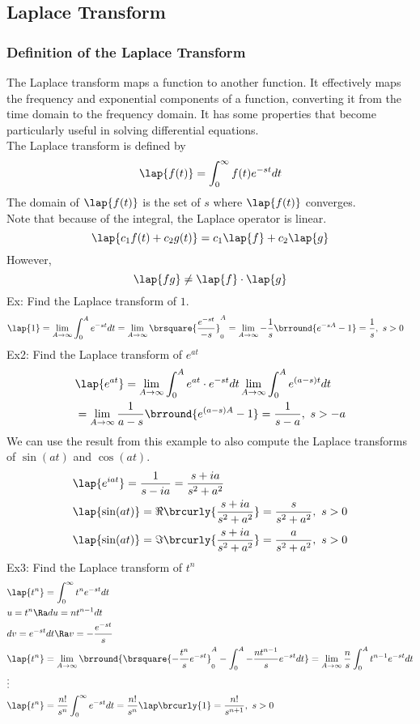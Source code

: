 \subsection{Laplace Transform}
\subsubsection{Definition of the Laplace Transform}
The Laplace transform maps a function to another function. It effectively maps the frequency and exponential components of a function, converting it from the time domain to the frequency domain. It has some properties that become particularly useful in solving differential equations.\\
The Laplace transform is defined by
$$\lap\{f(t)\}=\int_0^\infty f(t)e^{-st}dt$$
The domain of $\lap\{f(t)\}$ is the set of $s$ where $\lap\{f(t)\}$ converges.\\
Note that because of the integral, the Laplace operator is linear.
$$\lap\{c_1f(t)+c_2g(t)\}=c_1\lap\{f\}+c_2\lap\{g\}$$
However,
$$\lap\{fg\}\neq\lap\{f\}\cdot\lap\{g\}$$
Ex: Find the Laplace transform of $1$.
\begin{align*}
    &\lap\{1\}=\lim_{A\to\infty}\int_0^Ae^{-st}dt=\lim_{A\to\infty}\brsquare{\frac{e^{-st}}{-s}}_0^A=\lim_{A\to\infty}-\frac{1}{s}\brround{e^{-sA}-1}=\frac{1}{s},\ s>0
\end{align*}
Ex2: Find the Laplace transform of $e^{at}$
\begin{align*}
    &\lap\{e^{at}\}=\lim_{A\to\infty}\int_0^Ae^{at}\cdot e^{-st}dt\lim_{A\to\infty}\int_0^Ae^{(a-s)t}dt\\
    &=\lim_{A\to\infty}\frac{1}{a-s}\brround{e^{(a-s)A}-1}=\frac{1}{s-a},\ s>-a
\end{align*}
We can use the result from this example to also compute the Laplace transforms of $\sin(at)$ and $\cos(at)$.
\begin{align*}
    &\lap\{e^{iat}\}=\frac{1}{s-ia}=\frac{s+ia}{s^2+a^2}\\
    &\lap\{\sin(at)\}=\Re\brcurly{\frac{s+ia}{s^2+a^2}}=\frac{s}{s^2+a^2},\ s>0\\
    &\lap\{\sin(at)\}=\Im\brcurly{\frac{s+ia}{s^2+a^2}}=\frac{a}{s^2+a^2},\ s>0
\end{align*}
Ex3: Find the Laplace transform of $t^n$
\begin{align*}
    &\lap\{t^n\}=\int_0^\infty t^ne^{-st}dt\\
    &u=t^n\Ra du=nt^{n-1}dt\\
    &dv=e^{-st}dt\Ra v=-\frac{e^{-st}}{s}\\
    &\lap\{t^n\}=\lim_{A\to\infty}\brround{\brsquare{-\frac{t^n}{s}e^{-st}}_0^A-\int_0^A-\frac{nt^{n-1}}{s}e^{-st}dt}=\lim_{A\to\infty}\frac{n}{s}\int_0^At^{n-1}e^{-st}dt\\
    &\vdots\\
    &\lap\{t^n\}=\frac{n!}{s^n}\int_0^\infty e^{-st}dt=\frac{n!}{s^n}\lap\brcurly{1}=\frac{n!}{s^{n+1}},\ s>0
\end{align*}
